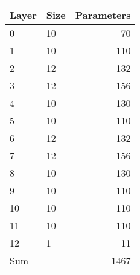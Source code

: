 \begin{tabular}{llr}
\toprule
 Layer   & Size   &   Parameters \\
\midrule
 0       & 10     &           70 \\
 1       & 10     &          110 \\
 2       & 12     &          132 \\
 3       & 12     &          156 \\
 4       & 10     &          130 \\
 5       & 10     &          110 \\
 6       & 12     &          132 \\
 7       & 12     &          156 \\
 8       & 10     &          130 \\
 9       & 10     &          110 \\
 10      & 10     &          110 \\
 11      & 10     &          110 \\
 12      & 1      &           11 \\
 Sum     &        &         1467 \\
\bottomrule
\end{tabular}
